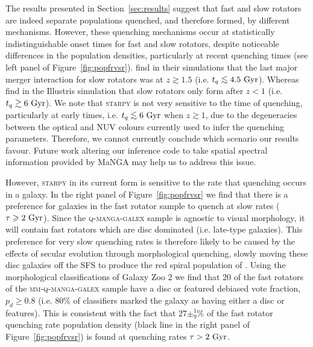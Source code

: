 \documentclass[useAMS,usenatbib]{mn2e}
\def\lesssim{\mathrel{\hbox{\rlap{\hbox{\lower3pt\hbox{$\sim$}}}\hbox{\raise2pt\hbox{$<$}}}}}
\begin{document}
The results presented in Section~\ref{sec:results} suggest that fast and slow rotators are indeed separate populations quenched, and therefore formed, by different mechanisms. However, these quenching mechanisms occur at statistically indistinguishable onset times for fast and slow rotators, despite noticeable differences in the population densities, particularly at recent quenching times (see left panel of Figure~\ref{fig:popfrvsr}). \cite{khochfar11} find in their simulations that the last major merger interaction for slow rotators was at $z \gtrsim 1.5$ (i.e. $t_q \lesssim 4.5~\rm{Gyr}$). Whereas \cite{penoyre17}  find in the Illustris simulation that slow rotators only form after $z < 1$ (i.e. $t_q \gtrsim 6~\rm{Gyr}$). We note that \textsc{starpy} is not very sensitive to the time of quenching, particularly at early times, i.e. $t_q \lesssim 6~\rm{Gyr}$ when $z \gtrsim 1$, due to the degeneracies between the optical and NUV colours currently used to infer the quenching parameters. Therefore, we cannot currently conclude which scenario our results favour. Future work altering our inference code to take spatial spectral information provided by MaNGA may help us to address this issue.

However, \textsc{starpy} in its current form is sensitive to the rate that quenching occurs in a galaxy. In the right panel of Figure~\ref{fig:popfrvsr} we find that there is a preference for galaxies in the fast rotator sample to quench at slow rates ($\tau \geq 2~\rm{Gyr}$). Since the \textsc{q-manga-galex} sample is agnostic to visual morphology, it will contain fast rotators which are disc dominated (i.e. late-type galaxies). This preference for very slow quenching rates is therefore likely to be caused by the effects of secular evolution through morphological quenching, slowly moving these disc galaxies off the SFS to produce the red spiral population of \cite{masters12a}. Using the morphological classifications of Galaxy Zoo 2 \citep[GZ2][]{lintott11, GZ2} we find that $20$ of the fast rotators of the \textsc{mm-q-manga-galex} sample have a disc or featured debiased vote fraction, $p_d \geq 0.8$ (i.e. $80\%$ of classifiers marked the galaxy as having either a disc or features). This is consistent with the fact that $27\pm^{1}_{9}\%$ of the fast rotator quenching rate population density (black line in the right panel of Figure~\ref{fig:popfrvsr}) is found at quenching rates $\tau > 2~\rm{Gyr}$. 
\end{document}
